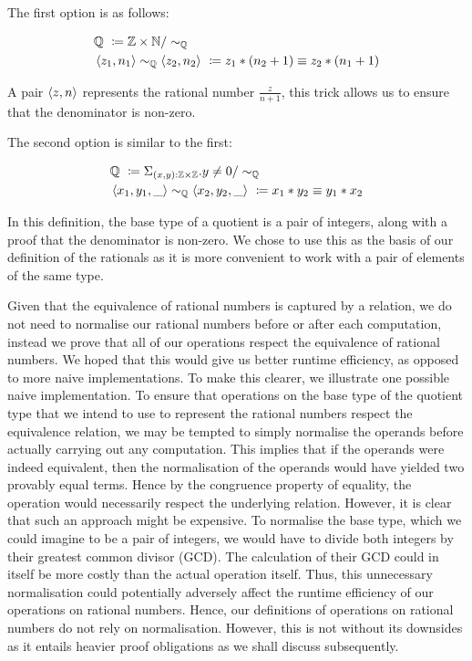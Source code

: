 \documentclass[12pt,twoside,maitrise]{dms}
\theoremstyle{definition}
\numberwithin{equation}{section}
\numberwithin{table}{chapter}
\numberwithin{figure}{chapter}
\begin{document}
The first option is as follows:

\begin{align*}
  & \mathbb{Q} \ \coloneqq \mathbb{Z} \times \mathbb{N} / \sim_{\mathbb{Q}} \\
  & \braket{z_1 , n_1} \sim_{\mathbb{Q}} \braket{z_2 , n_2} \ \coloneqq z_1 * (n_2 + 1) \equiv z_2 * (n_1 + 1)
\end{align*}

A pair $\braket{z , n}$ represents the rational number $\frac{z}{n + 1}$, this
trick allows us to ensure that the denominator is non-zero.

The second option is similar to the first:

\begin{align*}
  & \mathbb{Q} \ \coloneqq \Sigma_{\oftype{(x, y)}{\mathbb{Z} \times \mathbb{Z}}} . y \ne 0 / \sim_{\mathbb{Q}} \\
  & \braket{x_1 , y_1, \_} \sim_{\mathbb{Q}} \braket{x_2 , y_2, \_} \ \coloneqq x_1 * y_2 \equiv y_1 * x_2
\end{align*}

In this definition, the base type of a quotient is a pair of integers, along
with a proof that the denominator is non-zero. We chose to use this as the basis
of our definition of the rationals as it is more convenient to work with a pair
of elements of the same type.

Given that the equivalence of rational numbers is captured by a relation, we do
not need to normalise our rational numbers before or after each computation,
instead we prove that all of our operations respect the equivalence of rational
numbers. We hoped that this would give us better runtime efficiency, as opposed
to more naive implementations. To make this clearer, we illustrate one possible
naive implementation. To ensure that operations on the base type of the quotient
type that we intend to use to represent the rational numbers respect the
equivalence relation, we may be tempted to simply normalise the operands before
actually carrying out any computation. This implies that if the operands were
indeed equivalent, then the normalisation of the operands would have yielded two
provably equal terms. Hence by the congruence property of equality, the
operation would necessarily respect the underlying relation. However, it is
clear that such an approach might be expensive. To normalise the base type,
which we could imagine to be a pair of integers, we would have to divide both
integers by their greatest common divisor (GCD). The calculation of their GCD
could in itself be more costly than the actual operation itself. Thus, this
unnecessary normalisation could potentially adversely affect the runtime
efficiency of our operations on rational numbers. Hence, our definitions of
operations on rational numbers do not rely on normalisation. However, this is
not without its downsides as it entails heavier proof obligations as we shall
discuss subsequently.
\end{document}
